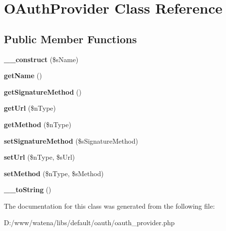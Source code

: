\hypertarget{class_o_auth_provider}{\section{O\-Auth\-Provider Class Reference}
\label{class_o_auth_provider}
}
\subsection*{Public Member Functions}
\begin{DoxyCompactItemize}
\item 
\hypertarget{class_o_auth_provider_a593f7882163443b02991ea0543a70767}{{\bfseries \-\_\-\-\_\-construct} (\$s\-Name)}\label{class_o_auth_provider_a593f7882163443b02991ea0543a70767}

\item 
\hypertarget{class_o_auth_provider_a78d5c9b104a06c7c7a4e12a7bd844eee}{{\bfseries get\-Name} ()}\label{class_o_auth_provider_a78d5c9b104a06c7c7a4e12a7bd844eee}

\item 
\hypertarget{class_o_auth_provider_a28c87a5c992db0f49375241113b2c2bb}{{\bfseries get\-Signature\-Method} ()}\label{class_o_auth_provider_a28c87a5c992db0f49375241113b2c2bb}

\item 
\hypertarget{class_o_auth_provider_a0f05c6f89a88fee4f8e4362c6b307d68}{{\bfseries get\-Url} (\$n\-Type)}\label{class_o_auth_provider_a0f05c6f89a88fee4f8e4362c6b307d68}

\item 
\hypertarget{class_o_auth_provider_a9b230cbe16c57358c3ef679cde9d1cef}{{\bfseries get\-Method} (\$n\-Type)}\label{class_o_auth_provider_a9b230cbe16c57358c3ef679cde9d1cef}

\item 
\hypertarget{class_o_auth_provider_a40b6ea469b7a1800cc5602558ffe0e71}{{\bfseries set\-Signature\-Method} (\$s\-Signature\-Method)}\label{class_o_auth_provider_a40b6ea469b7a1800cc5602558ffe0e71}

\item 
\hypertarget{class_o_auth_provider_a4d8f18668888f29902f7a3f0135a0b57}{{\bfseries set\-Url} (\$n\-Type, \$s\-Url)}\label{class_o_auth_provider_a4d8f18668888f29902f7a3f0135a0b57}

\item 
\hypertarget{class_o_auth_provider_a97cf5b56f3873da2fd564b46a9c49e29}{{\bfseries set\-Method} (\$n\-Type, \$s\-Method)}\label{class_o_auth_provider_a97cf5b56f3873da2fd564b46a9c49e29}

\item 
\hypertarget{class_o_auth_provider_aab25d47660c89b39ab2f8e768ca4a5c6}{{\bfseries \-\_\-\-\_\-to\-String} ()}\label{class_o_auth_provider_aab25d47660c89b39ab2f8e768ca4a5c6}

\end{DoxyCompactItemize}


The documentation for this class was generated from the following file\-:\begin{DoxyCompactItemize}
\item 
D\-:/www/watena/libs/default/oauth/oauth\-\_\-provider.\-php\end{DoxyCompactItemize}
